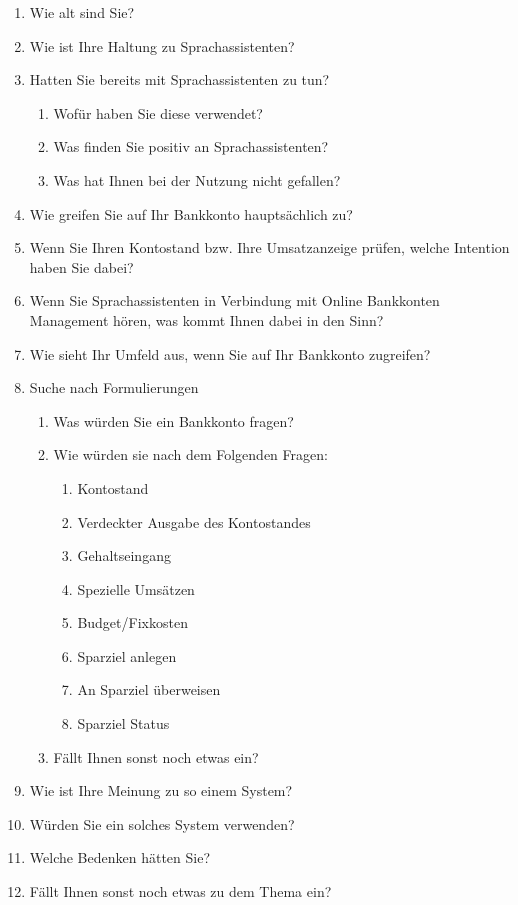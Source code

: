 \begin{enumerate}
    \item Wie alt sind Sie?
    \item Wie ist Ihre Haltung zu Sprachassistenten?
    \item Hatten Sie bereits mit Sprachassistenten zu tun?
    \begin{enumerate}
        \item Wofür haben Sie diese verwendet?
        \item Was finden Sie positiv an Sprachassistenten?
        \item Was hat Ihnen bei der Nutzung nicht gefallen?
    \end{enumerate}
    \item Wie greifen Sie auf Ihr Bankkonto hauptsächlich zu?
    \item Wenn Sie Ihren Kontostand bzw. Ihre Umsatzanzeige prüfen, welche Intention haben Sie dabei?
    \item Wenn Sie Sprachassistenten in Verbindung mit Online Bankkonten Management hören, was kommt Ihnen dabei in den Sinn?
    \item Wie sieht Ihr Umfeld aus, wenn Sie auf Ihr Bankkonto zugreifen?
    \item Suche nach Formulierungen
    \begin{enumerate}
        \item Was würden Sie ein Bankkonto fragen?
        \item Wie würden sie nach dem Folgenden Fragen:
        \begin{enumerate}
            \item Kontostand
            \item Verdeckter Ausgabe des Kontostandes
            \item Gehaltseingang
            \item Spezielle Umsätzen
            \item Budget/Fixkosten
            \item Sparziel anlegen
            \item An Sparziel überweisen
            \item Sparziel Status
        \end{enumerate}
        \item Fällt Ihnen sonst noch etwas ein?
    \end{enumerate}
    \item Wie ist Ihre Meinung zu so einem System?
    \item Würden Sie ein solches System verwenden?
    \item Welche Bedenken hätten Sie?
    \item Fällt Ihnen sonst noch etwas zu dem Thema ein?
\end{enumerate}

